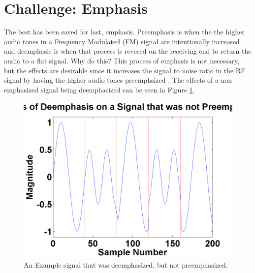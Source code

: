\section{Challenge: Emphasis}
The best has been saved for last, emphasis. Preemphasis is when the the higher audio tones in a Frequency Modulated (FM) signal are intentionally increased and deemphasis is when that process is revered on the receiving end to return the audio to a flat signal. Why do this? This process of emphasis is not necessary, but the effects are desirable since it increases the signal to noise ratio in the RF signal by having the higher audio tones preemphsized \cite{Gibilisco1994}. The effects of a non emphasized signal being deemphasized can be seen in Figure \ref{emphasisExample}.
\begin{figure}
  \centering
	\includegraphics[width=0.75\linewidth]{images/EffectsofDeemphasisonaSignalthatwasnotpreemphasized.png} 
	\caption{An Example signal that was deemphasized, but not preemphasized.}
   \label{emphasisExample}
\end{figure}
